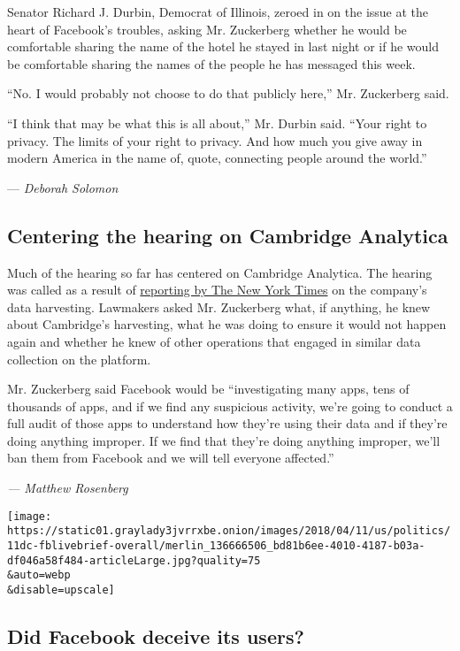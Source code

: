 Senator Richard J. Durbin, Democrat of Illinois, zeroed in on the issue
at the heart of Facebook's troubles, asking Mr. Zuckerberg whether he
would be comfortable sharing the name of the hotel he stayed in last
night or if he would be comfortable sharing the names of the people he
has messaged this week.

``No. I would probably not choose to do that publicly here,'' Mr.
Zuckerberg said.

``I think that may be what this is all about,'' Mr. Durbin said. ``Your
right to privacy. The limits of your right to privacy. And how much you
give away in modern America in the name of, quote, connecting people
around the world.''

--- \emph{Deborah Solomon}

\hypertarget{centering-the-hearing-on-cambridge-analytica}{%
\subsection{Centering the hearing on Cambridge
Analytica}\label{centering-the-hearing-on-cambridge-analytica}}

Much of the hearing so far has centered on Cambridge Analytica. The
hearing was called as a result of
\href{https://www.nytimes3xbfgragh.onion/2018/04/04/us/politics/cambridge-analytica-scandal-fallout.html}{reporting
by The New York Times} on the company's data harvesting. Lawmakers asked
Mr. Zuckerberg what, if anything, he knew about Cambridge's harvesting,
what he was doing to ensure it would not happen again and whether he
knew of other operations that engaged in similar data collection on the
platform.

Mr. Zuckerberg said Facebook would be ``investigating many apps, tens of
thousands of apps, and if we find any suspicious activity, we're going
to conduct a full audit of those apps to understand how they're using
their data and if they're doing anything improper. If we find that
they're doing anything improper, we'll ban them from Facebook and we
will tell everyone affected.''

\emph{--- Matthew Rosenberg}

\texttt{[image: https://static01.graylady3jvrrxbe.onion/images/2018/04/11/us/politics/11dc-fblivebrief-overall/merlin\_136666506\_bd81b6ee-4010-4187-b03a-df046a58f484-articleLarge.jpg?quality=75\\\&auto=webp\\\&disable=upscale]}

\hypertarget{did-facebook-deceive-its-users}{%
\subsection{Did Facebook deceive its
users?}\label{did-facebook-deceive-its-users}}

